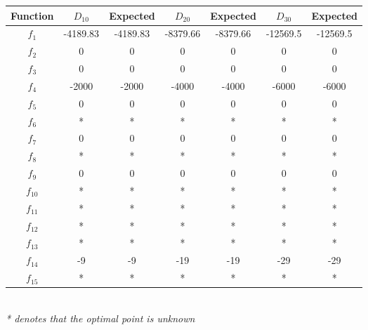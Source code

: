 \documentclass[paper=a4, fontsize=11pt]{scrartcl} %
\numberwithin{equation}{section} %
\numberwithin{figure}{section} %
\numberwithin{table}{section} %
\begin{document}
\begin{minipage}{\linewidth}
	\centering
	 \label{tab:title} 
	\begin{tabular}{c|cc|cc|cc}\label{T1}
		Function        & $D_{10}$ & Expected & $D_{20}$ & Expected & $D_{30}$  & Expected \\
		\hline
		$f_1$ 			& -4189.83 & -4189.83 & -8379.66 & -8379.66 & -12569.5 & -12569.5 \\
		$f_2$           & 0 & 0 & 0 & 0 &  0 & 0 \\
		$f_3$           & 0 & 0 & 0 & 0 &  0 & 0 \\
		$f_4$     		& -2000 & -2000 & -4000 & -4000 & -6000 & -6000 \\
		$f_5$           & 0 & 0 & 0 & 0 &  0 & 0 \\
		$f_6$    		& * & * & * & * &  * & * \\
		$f_7$           & 0 & 0 & 0 & 0 &  0 & 0 \\
		$f_8$    		& * & * & * & * &  * & * \\
		$f_9$           & 0 & 0 & 0 & 0 &  0 & 0 \\
		$f_{10}$   		& * & * & * & * &  * & * \\
		$f_{11}$   		& * & * & * & * &  * & * \\
		$f_{12}$   		& * & * & * & * &  * & * \\
		$f_{13}$   		& * & * & * & * &  * & * \\
		$f_{14}$     	& -9 & -9 & -19 & -19 &  -29 & -29 \\
		$f_{15}$     	& * & * & * & * &  * & * \\
	\end{tabular}
	\bigskip\\
	\small
	\textit{* denotes that the optimal point is unknown}
\end{minipage}



\end{document}
